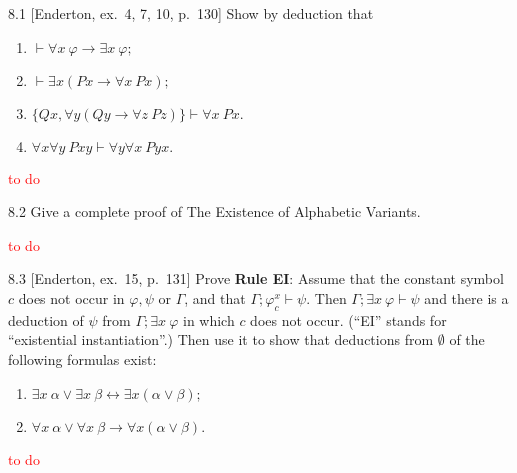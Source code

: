 
\begin{exercise}{8.1}
  [Enderton, ex.~4, 7, 10, p.~130] Show by deduction that
  \begin{enumerate}
    \item $\vdash\forall x\ \varphi\rightarrow\exists x\ \varphi;$
    \item $\vdash\exists x(Px\rightarrow\forall x\ Px);$
    \item $\{Qx, \forall y(Qy\rightarrow\forall z\ Pz)\}\vdash\forall x\ Px.$
    \item $\forall x\forall y\ Pxy\vdash\forall y\forall x\ Pyx.$\qedhere
  \end{enumerate}
\end{exercise}

\textcolor{red}{to do}

\begin{exercise}{8.2}
  Give a complete proof of The Existence of Alphabetic Variants.
\end{exercise}

\textcolor{red}{to do}

\begin{exercise}{8.3}
  [Enderton, ex.~15, p.~131] Prove \textbf{Rule EI}: Assume that the constant symbol $c$ does not occur in $\varphi,\psi$ or $\Gamma$, and that $\Gamma;\varphi_c^x\vdash \psi$. Then $\Gamma;\exists x\ \varphi\vdash \psi$ and there is a deduction of $\psi$ from $\Gamma;\exists x\ \varphi$ in which $c$ does not occur. (``EI'' stands for ``existential instantiation''.) Then use it to show that deductions from $\emptyset$ of the following formulas exist:
  \begin{enumerate}
    \item $\exists x\ \alpha\vee\exists x\ \beta \leftrightarrow \exists x(\alpha\vee \beta);$
    \item $\forall x\ \alpha\vee\forall x\ \beta \rightarrow \forall x(\alpha\vee \beta).$\qedhere
  \end{enumerate}
\end{exercise}

\textcolor{red}{to do}
